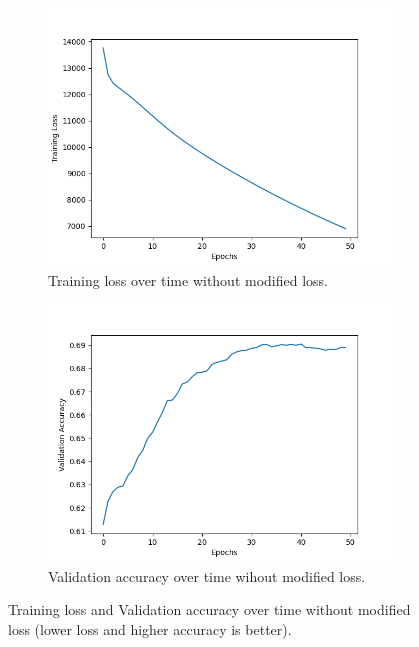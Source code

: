 \documentclass[10pt]{article}
\begin{document}
\begin{enumerate}
\begin{enumerate}[label = \textbf{\alph*}.]
        \begin{figure}[h!]
            \centering
            \begin{subfigure}[h!]{.46\textwidth}
                \centering
                \includegraphics[width=.95\linewidth]{final/part_a_q3d1.png}
                \caption{Training loss over time without modified loss.}
            \end{subfigure}
            \quad
            \begin{subfigure}[h!]{.46\textwidth}
                \centering
                \includegraphics[width=.95\linewidth]{final/part_a_q3d2.png}
                \caption{Validation accuracy over time wihout modified loss.}
            \end{subfigure}
            \caption{Training loss and Validation accuracy over time without modified loss (lower loss and higher accuracy is better).}
            \label{fig:pAq3d}
        \end{figure}



\end{enumerate}
\end{enumerate}
\end{document}
